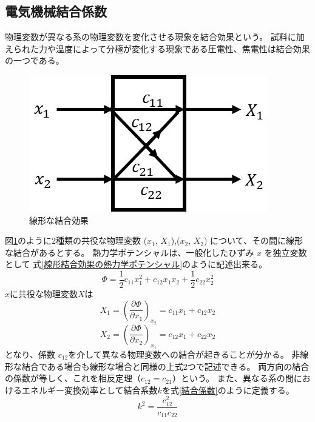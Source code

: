 \documentclass[dvipdfmx,12pt,a4paper]{jreport}
\begin{document}
			\subsection{電気機械結合係数}
			物理変数が異なる系の物理変数を変化させる現象を結合効果という。
			試料に加えられた力や温度によって分極が変化する現象である圧電性、焦電性は結合効果の一つである。
			\begin{figure}[h]
				\centering
				\includegraphics{結合効果.jpg}
				\caption{線形な結合効果}
				\label{結合効果}
			\end{figure}

			図\ref{結合効果}のように2種類の共役な物理変数 ($x_1$, $X_1$),($x_2$, $X_2$)
			について、その間に線形な結合があるとする。
			熱力学ポテンシャルは、一般化したひずみ $x$ を独立変数として
			式\ref{線形結合効果の熱力学ポテンシャル}のように記述出来る。
			\begin{equation}
				\Phi=\frac{1}{2}c_{11}x_1^2 + c_{12}x_1x_2+\frac{1}{2}c_{22}x_2^2
				\label{線形結合効果の熱力学ポテンシャル}
			\end{equation}
			$x$に共役な物理変数$X$は
			\begin{equation}
				X_1 = \left( \frac{\partial \Phi}{\partial x_1} \right)_{x_2} = c_{11}x_1+c_{12}x_2
			\end{equation}
			\begin{equation}
				X_2 = \left( \frac{\partial \Phi}{\partial x_2} \right)_{x_1} = c_{12}x_1 + c_{22}x_2
			\end{equation}
			となり、係数 $c_{12}$を介して異なる物理変数への結合が起きることが分かる。
			非線形な結合である場合も線形な場合と同様の上式2つで記述できる。
			両方向の結合の係数が等しく、これを相反定理（$c_{12}=c_{21}$）という。
			また、異なる系の間におけるエネルギー変換効率として結合系数$k$を式\ref{結合係数}のように定義する。
			\begin{equation}
				k^2=\frac{c_{12}^2}{c_{11}c_{22}}
				\label{結合係数}
			\end{equation}
			
\end{document}
